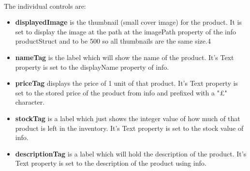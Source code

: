 ﻿\documentclass{article}
\begin{document}
    \paragraph{}
    The individual controls are:
    \begin{itemize}
        \item \textbf{displayedImage} is the thumbnail (small cover image) for the product.
        It is set to display the image at the path at the imagePath property of the info productStruct and to be 500 so all thumbnails are the same size.4
        \item \textbf{nameTag} is the label which will show the name of the product.
        It's Text property is set to the displayName property of info.
        \item \textbf{priceTag} displays the price of 1 unit of that product.
        It's Text property is set to the stored price of the product from info and prefixed with a "£" character.
        \item \textbf{stockTag} is a label which just shows the integer value of how much of that product is left in the inventory.
        It's Text property is set to the stock value of info.
        \item \textbf{descriptionTag} is a label which will hold the description of the product.
        It's Text property is set to the description of the product using info.
    \end{itemize}
\end{document}
